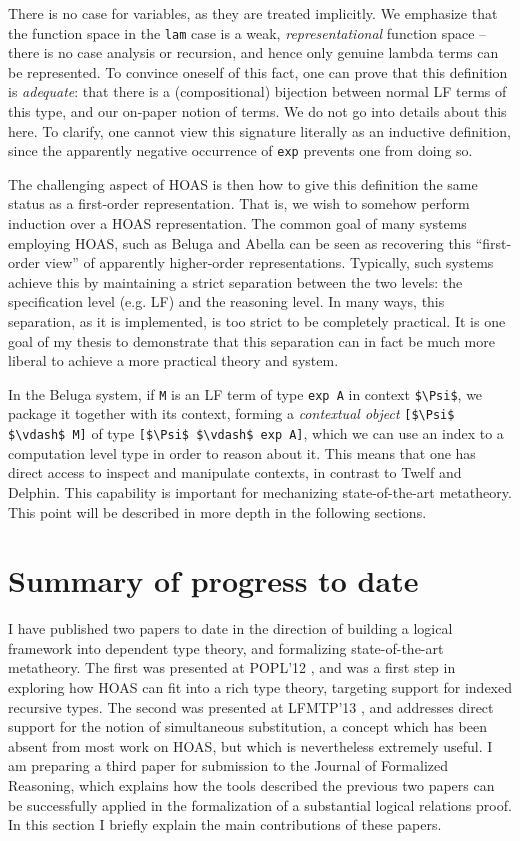 \documentclass{article}
\begin{document}
There is no case for variables, as they are
treated implicitly. We emphasize that the function space in the
\lstinline{lam} case is a weak, \emph{representational} function space
-- there is no case analysis or recursion, and hence only genuine
lambda terms can be represented. To convince oneself of this fact, one can prove that this definition is
\emph{adequate}: that there is a (compositional) bijection between normal LF terms of
this type, and our on-paper notion of terms. We do not go into details
about this here. To clarify, one cannot view this signature literally as an inductive
definition, since the apparently negative occurrence of
\lstinline{exp} prevents one from doing so.

The challenging aspect of HOAS is then how to give this definition the same
status as a first-order representation. That is, we wish to somehow
perform induction over a HOAS representation. The
common goal of many systems employing HOAS, such as Beluga \citep{Pientka:IJCAR10} and
Abella \citep{Gacek:IJCAR08} can be seen as recovering this ``first-order view'' of
apparently higher-order representations. Typically, such systems
achieve this by maintaining a strict separation between the two
levels: the specification level (e.g. LF) and the reasoning level. In many ways, this
separation, as it is implemented, is too strict to be completely practical. It is one goal of
my thesis to demonstrate that this separation can in fact
be much more liberal to achieve a more practical theory and system.

In the Beluga system, if \lstinline{M} is an LF term of type
\lstinline{exp A} in context \lstinline{$\Psi$}, we package it
together with its context, forming a \emph{contextual object} \lstinline{[$\Psi$ $\vdash$ M]} of
type \lstinline{[$\Psi$ $\vdash$ exp A]}, which we can use an index to
a computation level type in order to reason
about it. This means that one has direct access to inspect and manipulate
contexts, in contrast to Twelf and Delphin. This capability is important for mechanizing state-of-the-art
metatheory. This point will be described in more depth in the following
sections.

\section{Summary of progress to date}
I have published two papers to date in the direction of building a logical
framework into dependent type theory, and formalizing state-of-the-art
metatheory. The first
was presented at POPL'12 \citep{Cave12} , and was a first step in
exploring how HOAS can fit into a rich type theory, targeting support
for indexed recursive types. The second was presented at LFMTP'13
\citep{Cave13}, and addresses direct support for the notion of
simultaneous substitution, a concept which has been absent from most
work on HOAS, but which is nevertheless extremely useful. I am
preparing a third paper \citep{Cave14} for submission to the Journal
of Formalized Reasoning, which explains how the tools described the
previous two papers can be successfully applied in the formalization
of a substantial logical relations proof. In this
section I briefly explain the main contributions of these papers.
\end{document}
